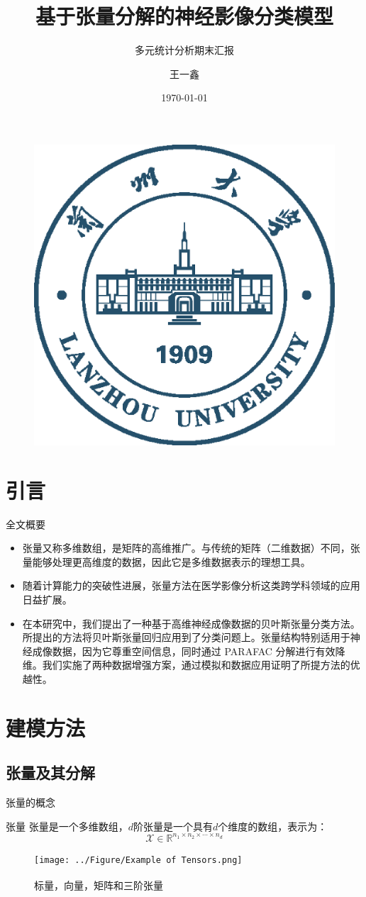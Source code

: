 \documentclass{beamer}
\author{王一鑫}
\title{基于张量分解的神经影像分类模型}
\subtitle{多元统计分析期末汇报}
\institute{兰州大学萃英学院}
\date{\today}
\newcommand{\supcite}[1]{\textsuperscript{\cite{#1}}}
\begin{document}
	
	\kaishu
	\begin{frame}
		\titlepage
		\begin{figure}[htpb]
			\begin{center}
				\includegraphics[width=0.2\linewidth]{pic/Lanzhou_University_logo.eps}
			\end{center}
		\end{figure}
	\end{frame}
	
	\begin{frame}
		\tableofcontents[sectionstyle=show,subsectionstyle=show/shaded/hide,subsubsectionstyle=show/shaded/hide]
	\end{frame}
	
	\section{引言}
	\begin{frame}{全文概要}
		\begin{itemize}[<+->]
			\item 张量又称多维数组，是矩阵的高维推广。与传统的矩阵（二维数据）不同，张量能够处理更高维度的数据，因此它是多维数据表示的理想工具。
			\item 随着计算能力的突破性进展，张量方法在医学影像分析这类跨学科领域的应用日益扩展。
			\item 在本研究中，我们提出了一种基于高维神经成像数据的贝叶斯张量分类方法。所提出的方法将贝叶斯张量回归应用到了分类问题上。张量结构特别适用于神经成像数据，因为它尊重空间信息，同时通过 PARAFAC 分解进行有效降维。我们实施了两种数据增强方案，通过模拟和数据应用证明了所提方法的优越性。
		\end{itemize}
	\end{frame}
	
	\section{建模方法}
	\subsection{张量及其分解}
	\begin{frame}{张量的概念}
		\begin{exampleblock}{张量}
			张量是一个多维数组，$d$阶张量是一个具有$d$个维度的数组，表示为：
			\[
			\mathcal{X} \in \mathbb{R}^{n_1 \times n_2 \times \cdots \times n_d}
			\]
		\end{exampleblock}
			\begin{figure}[h]
				\small
				\centering
				\texttt{[image: ../Figure/Example of Tensors.png]}
				\caption{标量，向量，矩阵和三阶张量\supcite{a}}
				\label{Fig:Example of Tensors}
			\end{figure}
	\end{frame}
	
\end{document}
